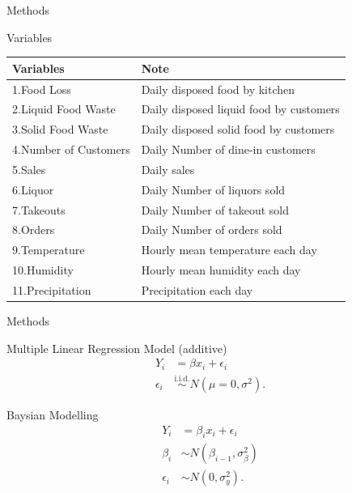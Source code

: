 \documentclass[
  ignorenonframetext,
]{beamer}
\begin{document}
\begin{frame}{Methods}
\protect\hypertarget{methods-4}{}
\begin{block}{Variables}
\protect\hypertarget{variables}{}
\begin{longtable}[]{@{}ll@{}}
\toprule()
Variables & Note \\
\midrule()
\endhead
1.Food Loss & Daily disposed food by kitchen \\
2.Liquid Food Waste & Daily disposed liquid food by customers \\
3.Solid Food Waste & Daily disposed solid food by customers \\
4.Number of Customers & Daily Number of dine-in customers \\
5.Sales & Daily sales \\
6.Liquor & Daily Number of liquors sold \\
7.Takeouts & Daily Number of takeout sold \\
8.Orders & Daily Number of orders sold \\
9.Temperature & Hourly mean temperature each day \\
10.Humidity & Hourly mean humidity each day \\
11.Precipitation & Precipitation each day \\
\bottomrule()
\end{longtable}
\end{block}
\end{frame}

\begin{frame}{Methods}
\protect\hypertarget{methods-5}{}
\begin{block}{Multiple Linear Regression Model (additive)}
\protect\hypertarget{multiple-linear-regression-model-additive}{}
\[
\begin{aligned}
Y_i &= \beta x_i + \epsilon_i\\
\epsilon_i &\overset{\text{i.i.d.}}{\sim} N(\mu=0, \sigma^2).
\end{aligned}
\]
\end{block}

\begin{block}{Baysian Modelling}
\protect\hypertarget{baysian-modelling}{}
\[
\begin{aligned}
Y_i &= \beta_i x_i + \epsilon_i\\
\beta_{i} &\sim N(\beta_{i-1}, \sigma_{\beta}^2)\\
\epsilon_i &\sim N(0, \sigma_{y}^2).
\end{aligned}
\]
\end{block}
\end{frame}
\end{document}

